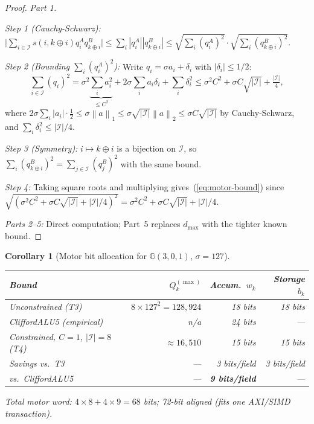 \documentclass[11pt,a4paper]{article}
\theoremstyle{definition}
\theoremstyle{plain}
\newtheorem{corollary}{Corollary}[section]
\theoremstyle{remark}
\newcommand{\GA}{\mathbb{G}}
\newcommand{\norm}[1]{\left\|#1\right\|}
\begin{document}
\begin{proof}
\textit{Part 1.}

\emph{Step 1 (Cauchy-Schwarz):}
$\bigl|\sum_{i\in\mathcal{I}}s(i,k\oplus i)q_i^Aq_{k\oplus i}^B\bigr|
\le\sum_i|q_i^A||q_{k\oplus i}^B|
\le\sqrt{\sum_i(q_i^A)^2}\cdot\sqrt{\sum_i(q_{k\oplus i}^B)^2}.$

\emph{Step 2 (Bounding $\sum_i(q_i^A)^2$):}
Write $q_i=\sigma a_i+\delta_i$ with $|\delta_i|\le1/2$:
\begin{equation}
  \sum_{i\in\mathcal{I}}(q_i)^2
  = \sigma^2\underbrace{\sum_i a_i^2}_{\le C^2}
    +2\sigma\sum_i a_i\delta_i+\sum_i\delta_i^2
  \le \sigma^2C^2+\sigma C\sqrt{|\mathcal{I}|}+\tfrac{|\mathcal{I}|}{4},
\end{equation}
where $2\sigma\sum_i|a_i|\cdot\tfrac{1}{2}\le\sigma\norm{a}_1\le
\sigma\sqrt{|\mathcal{I}|}\norm{a}_2\le\sigma C\sqrt{|\mathcal{I}|}$
by Cauchy-Schwarz, and $\sum_i\delta_i^2\le|\mathcal{I}|/4$.

\emph{Step 3 (Symmetry):}
$i\mapsto k\oplus i$ is a bijection on $\mathcal{I}$, so
$\sum_i(q_{k\oplus i}^B)^2=\sum_{j\in\mathcal{I}}(q_j^B)^2$ with the same bound.

\emph{Step 4:} Taking square roots and multiplying gives~(\ref{eq:motor-bound})
since $\sqrt{(\sigma^2C^2+\sigma C\sqrt{|\mathcal{I}|}+|\mathcal{I}|/4)^2}
=\sigma^2C^2+\sigma C\sqrt{|\mathcal{I}|}+|\mathcal{I}|/4$.

\textit{Parts 2--5:} Direct computation; Part~5 replaces $d_{\max}$ with
the tighter known bound.
\end{proof}

\begin{corollary}[Motor bit allocation for $\GA(3,0,1)$, $\sigma=127$]
\label{cor:motor-bits}
\begin{center}\small
\begin{tabular}{lrrr}
\toprule
Bound & $Q_k^{(\max)}$ & Accum.\ $w_k$ & Storage $b_k$ \\
\midrule
Unconstrained (T3) & $8\times127^2=128{,}924$ & 18 bits & 18 bits \\
CliffordALU5 (empirical) & n/a & \emph{24 bits} & --- \\
Constrained, $C=1$, $|\mathcal{I}|=8$ (T4) & $\approx16{,}510$ & 15 bits & 15 bits \\
\midrule
Savings vs.\ T3 & --- & 3 bits/field & 3 bits/field \\
vs.\ CliffordALU5 & --- & \textbf{9 bits/field} & --- \\
\bottomrule
\end{tabular}
\end{center}
Total motor word: $4\times8+4\times9=68$ bits;
72-bit aligned (fits one AXI/SIMD transaction).
\end{corollary}
\end{document}
